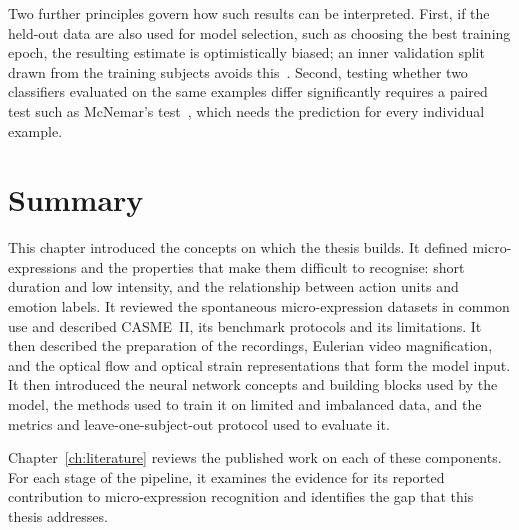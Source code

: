 Two further principles govern how such results can be interpreted. First, if the held-out data are also used for model selection, such as choosing the best training epoch, the resulting estimate is optimistically biased; an inner validation split drawn from the training subjects avoids this~\cite{varma2006}. Second, testing whether two classifiers evaluated on the same examples differ significantly requires a paired test such as McNemar's test~\cite{mcnemar1947}, which needs the prediction for every individual example.


\section{Summary}
\label{sec:ch2-conclusion}

This chapter introduced the concepts on which the thesis builds. It defined micro-expressions and the properties that make them difficult to recognise: short duration and low intensity, and the relationship between action units and emotion labels. It reviewed the spontaneous micro-expression datasets in common use and described CASME~II, its benchmark protocols and its limitations. It then described the preparation of the recordings, Eulerian video magnification, and the optical flow and optical strain representations that form the model input. It then introduced the neural network concepts and building blocks used by the model, the methods used to train it on limited and imbalanced data, and the metrics and leave-one-subject-out protocol used to evaluate it.

Chapter~\ref{ch:literature} reviews the published work on each of these components. For each stage of the pipeline, it examines the evidence for its reported contribution to micro-expression recognition and identifies the gap that this thesis addresses.
